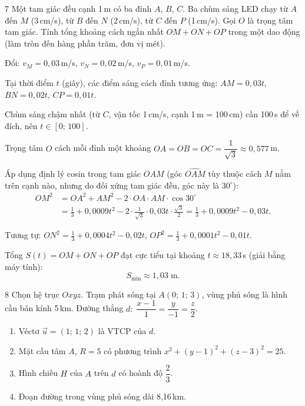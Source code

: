 \separator

\begin{baitoan}{7 \hfill {}}
Một tam giác đều cạnh 1\,m có ba đỉnh $A$, $B$, $C$. Ba chùm sáng LED chạy từ $A$ đến $M$ (3\,cm/s), từ $B$ đến $N$ (2\,cm/s), từ $C$ đến $P$ (1\,cm/s). Gọi $O$ là trọng tâm tam giác. Tính tổng khoảng cách ngắn nhất $OM + ON + OP$ trong một dao động (làm tròn đến hàng phần trăm, đơn vị mét).
\end{baitoan}

\begin{loigiai}
Đổi: $v_M = 0{,}03$\,m/s, $v_N = 0{,}02$\,m/s, $v_P = 0{,}01$\,m/s.

Tại thời điểm $t$ (giây), các điểm sáng cách đỉnh tương ứng: $AM = 0{,}03t$, $BN = 0{,}02t$, $CP = 0{,}01t$.

Chùm sáng chậm nhất (từ $C$, vận tốc 1\,cm/s, cạnh 1\,m = 100\,cm) cần 100\,s để về đích, nên $t \in [0;\,100]$.

Trọng tâm $O$ cách mỗi đỉnh một khoảng $OA = OB = OC = \dfrac{1}{\sqrt{3}} \approx 0{,}577$\,m.

Áp dụng định lý cosin trong tam giác $OAM$ (góc $\widehat{OAM}$ tùy thuộc cách $M$ nằm trên cạnh nào, nhưng do đối xứng tam giác đều, góc này là $30^\circ$):
\begin{align*}
OM^2 &= OA^2 + AM^2 - 2 \cdot OA \cdot AM \cdot \cos 30^\circ \\
     &= \frac{1}{3} + 0{,}0009t^2 - 2 \cdot \frac{1}{\sqrt{3}} \cdot 0{,}03t \cdot \frac{\sqrt{3}}{2} = \frac{1}{3} + 0{,}0009t^2 - 0{,}03t.
\end{align*}

Tương tự: $ON^2 = \frac{1}{3} + 0{,}0004t^2 - 0{,}02t$, \; $OP^2 = \frac{1}{3} + 0{,}0001t^2 - 0{,}01t$.

Tổng $S(t) = OM + ON + OP$ đạt cực tiểu tại khoảng $t \approx 18{,}33$\,s (giải bằng máy tính):
\[ S_{\min} \approx \boxed{1{,}03\;\text{m}}. \]
\end{loigiai}

\separator

\begin{baitoan}{8 \hfill {}}
Chọn hệ trục $Oxyz$. Trạm phát sóng tại $A(0;\,1;\,3)$, vùng phủ sóng là hình cầu bán kính 5\,km. Đường thẳng $d:\; \dfrac{x-1}{1} = \dfrac{y}{-1} = \dfrac{z}{2}$.

\begin{enumerate}[label=\alph*), leftmargin=2em]
  \item Véctơ $\vec{u} = (1;\,1;\,2)$ là VTCP của $d$.
  \item Mặt cầu tâm $A$, $R = 5$ có phương trình $x^2 + (y-1)^2 + (z-3)^2 = 25$.
  \item Hình chiếu $H$ của $A$ trên $d$ có hoành độ $\dfrac{2}{3}$.
  \item Đoạn đường trong vùng phủ sóng dài 8,16\,km.
\end{enumerate}
\end{baitoan}

